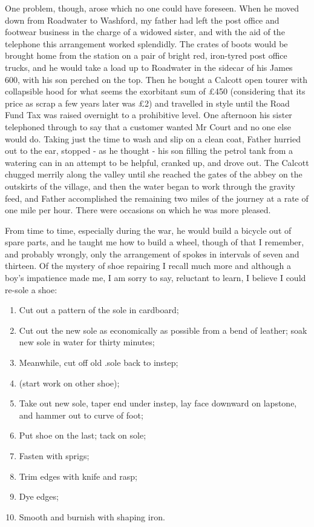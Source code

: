One problem, though, arose which no one could have foreseen. When he moved down from Roadwater to Washford, my father had left the post office and footwear business in the charge of a widowed sister, and with the aid of the telephone this arrangement worked splendidly. The crates of boots would be brought home from the station on a pair of bright red, iron-tyred post office trucks, and he would take a load up to Roadwater in the sidecar of his James 600, with his son perched on the top. Then he bought a Calcott open tourer with collapsible hood for what seems the exorbitant sum of £450 (considering that its price as scrap a few years later was £2) and travelled in style until the Road Fund Tax was raised overnight to a prohibitive level. One afternoon his sister telephoned through to say that a customer wanted Mr Court and no one else would do. Taking just the time to wash and slip on a clean coat, Father hurried out to the ear, stopped - as he thought - his son filling the petrol tank from a watering can in an attempt to be helpful, cranked up, and drove out. The Calcott chugged merrily along the valley until she reached the gates of the abbey on the outskirts of the village, and then the water began to work through the gravity feed, and Father accomplished the remaining two miles of the journey at a rate of one mile per hour. There were occasions on which he was more pleased.

From time to time, especially during the war, he would build a bicycle out of spare parts, and he taught me how to build a wheel, though of that I remember, and probably wrongly, only the arrangement of spokes in intervals of seven and thirteen. Of the mystery of shoe repairing I recall much more and although a boy's impatience made me, I am sorry to say, reluctant to learn, I believe I could re-sole a shoe: \\

\begin{enumerate}
\item Cut out a pattern of the sole in cardboard;
\item Cut out the new sole as economically as possible from a bend of leather; soak new sole in water for thirty minutes; 
\item Meanwhile, cut off old .sole back to instep; 
\item (start work on other shoe);
\item Take out new sole, taper end under instep, lay face downward on lapstone, and hammer out to curve of foot;
\item Put shoe on the last; tack on sole;
\item Fasten with sprigs;
\item Trim edges with knife and rasp;
\item Dye edges;
\item Smooth and burnish with shaping iron. \\
\end{enumerate}


